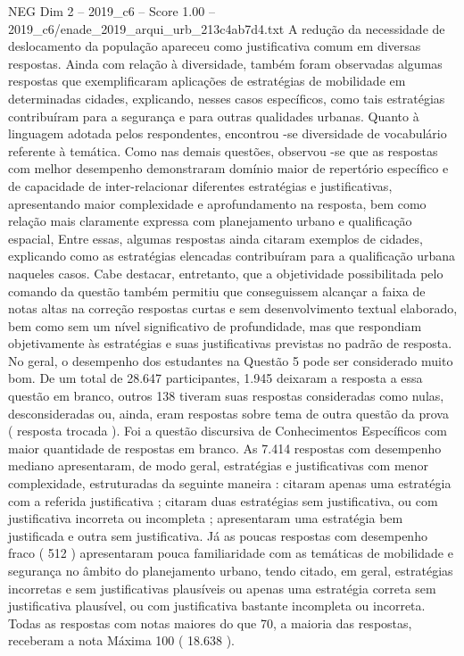 \begin{textsample}{NEG Dim 2 – 2019\_c6 – Score 1.00 – 2019\_c6/enade\_2019\_arqui\_urb\_213c4ab7d4.txt}
A redução da necessidade de deslocamento da população apareceu como justificativa comum em diversas respostas.
Ainda com relação à diversidade, também foram observadas algumas respostas que exemplificaram aplicações de estratégias de mobilidade em determinadas cidades, explicando, nesses casos específicos, como tais estratégias contribuíram para a segurança e para outras qualidades urbanas.
Quanto à linguagem adotada pelos respondentes, encontrou -se diversidade de vocabulário referente à temática.
Como nas demais questões, observou -se que as respostas com melhor desempenho demonstraram domínio maior de repertório específico e de capacidade de inter-relacionar diferentes estratégias e justificativas, apresentando maior complexidade e aprofundamento na resposta, bem como relação mais claramente expressa com planejamento urbano e qualificação espacial, Entre essas, algumas respostas ainda citaram exemplos de cidades, explicando como as estratégias elencadas contribuíram para a qualificação urbana naqueles casos.
Cabe destacar, entretanto, que a objetividade possibilitada pelo comando da questão também permitiu que conseguissem alcançar a faixa de notas altas na correção respostas curtas e sem desenvolvimento textual elaborado, bem como sem um nível significativo de profundidade, mas que respondiam objetivamente às estratégias e suas justificativas previstas no padrão de resposta.
No geral, o desempenho dos estudantes na Questão 5 pode ser considerado muito bom.
De um total de 28.647 participantes, 1.945 deixaram a resposta a essa questão em branco, outros 138 tiveram suas respostas consideradas como nulas, desconsideradas ou, ainda, eram respostas sobre tema de outra questão da prova ( resposta trocada ).
Foi a questão discursiva de Conhecimentos Específicos com maior quantidade de respostas em branco.
As 7.414 respostas com desempenho mediano apresentaram, de modo geral, estratégias e justificativas com menor complexidade, estruturadas da seguinte maneira : citaram apenas uma estratégia com a referida justificativa ; citaram duas estratégias sem justificativa, ou com justificativa incorreta ou incompleta ; apresentaram uma estratégia bem justificada e outra sem justificativa.
Já as poucas respostas com desempenho fraco ( 512 ) apresentaram pouca familiaridade com as temáticas de mobilidade e segurança no âmbito do planejamento urbano, tendo citado, em geral, estratégias incorretas e sem justificativas plausíveis ou apenas uma estratégia correta sem justificativa plausível, ou com justificativa bastante incompleta ou incorreta.
Todas as respostas com notas maiores do que 70, a maioria das respostas, receberam a nota Máxima 100 ( 18.638 ).

\end{textsample}

